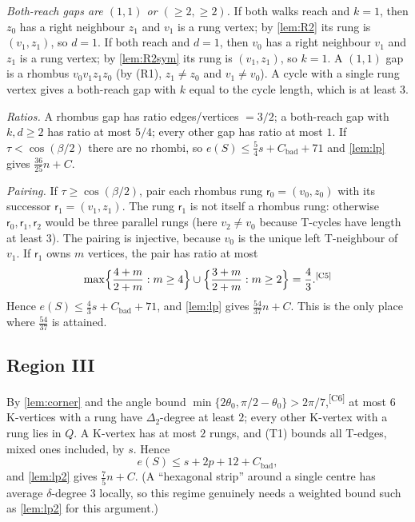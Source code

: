\documentclass[11pt]{amsart}
\theoremstyle{definition}
\theoremstyle{remark}
\newcommand{\Dt}{\Delta_2}
\newcommand{\chk}[1]{\textsuperscript{[#1]}}
\begin{document}
\emph{Both-reach gaps are $(1,1)$ or $(\ge2,\ge2)$.} If both walks reach and $k=1$, then $z_0$ has a right neighbour $z_1$ and $v_1$ is a rung vertex; by \cref{lem:R2} its rung is $(v_1,z_1)$, so $d=1$. If both reach and $d=1$, then $v_0$ has a right neighbour $v_1$ and $z_1$ is a rung vertex; by \cref{lem:R2sym} its rung is $(v_1,z_1)$, so $k=1$. A $(1,1)$ gap is a rhombus $v_0v_1z_1z_0$ (by (R1), $z_1\neq z_0$ and $v_1\neq v_0$). A cycle with a single rung vertex gives a both-reach gap with $k$ equal to the cycle length, which is at least $3$.

\emph{Ratios.} A rhombus gap has ratio edges/vertices $=3/2$; a both-reach gap with $k,d\ge2$ has ratio at most $5/4$; every other gap has ratio at most $1$. If $\tau<\cos(\beta/2)$ there are no rhombi, so $e(S)\le\frac54s+C_{\mathrm{bad}}+71$ and \cref{lem:lp} gives $\frac{36}{25}n+C$.

\emph{Pairing.} If $\tau\ge\cos(\beta/2)$, pair each rhombus rung $\mathsf r_0=(v_0,z_0)$ with its successor $\mathsf r_1=(v_1,z_1)$. The rung $\mathsf r_1$ is not itself a rhombus rung: otherwise $\mathsf r_0,\mathsf r_1,\mathsf r_2$ would be three parallel rungs (here $v_2\neq v_0$ because T-cycles have length at least $3$). The pairing is injective, because $v_0$ is the unique left T-neighbour of $v_1$. If $\mathsf r_1$ owns $m$ vertices, the pair has ratio at most
\[
\max\Bigl\{\frac{4+m}{2+m}: m\ge4\Bigr\}\cup\Bigl\{\frac{3+m}{2+m}: m\ge2\Bigr\}=\frac43 .\chk{C5}
\]
Hence $e(S)\le\frac43s+C_{\mathrm{bad}}+71$, and \cref{lem:lp} gives $\frac{54}{37}n+C$. This is the only place where $\frac{54}{37}$ is attained.

\subsection*{Region III}
By \cref{lem:corner} and the angle bound $\min\{2\theta_0,\pi/2-\theta_0\}>2\pi/7$,\chk{C6} at most $6$ K-vertices with a rung have $\Dt$-degree at least $2$; every other K-vertex with a rung lies in $Q$. A K-vertex has at most $2$ rungs, and (T1) bounds all T-edges, mixed ones included, by $s$. Hence
\[
e(S)\le s+2p+12+C_{\mathrm{bad}},
\]
and \cref{lem:lp2} gives $\frac75n+C$. (A ``hexagonal strip'' around a single centre has average $\delta$-degree $3$ locally, so this regime genuinely needs a weighted bound such as \cref{lem:lp2} for this argument.)
\end{document}
